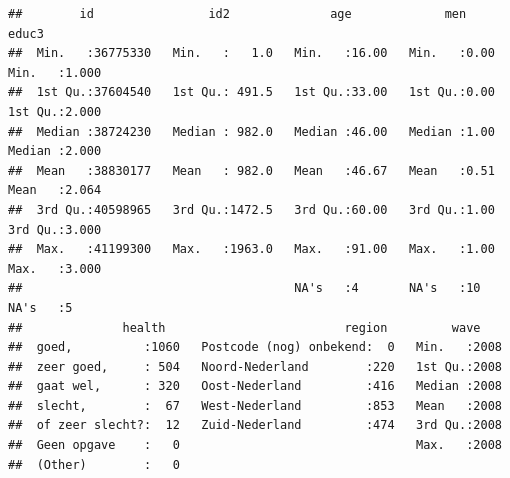 \documentclass[
]{book}
\newenvironment{Shaded}{\begin{snugshade}}{\end{snugshade}}
\newcommand{\CommentTok}[1]{\textcolor[rgb]{0.56,0.35,0.01}{\textit{#1}}}
\newcommand{\DecValTok}[1]{\textcolor[rgb]{0.00,0.00,0.81}{#1}}
\newcommand{\KeywordTok}[1]{\textcolor[rgb]{0.13,0.29,0.53}{\textbf{#1}}}
\newcommand{\NormalTok}[1]{#1}
\newcommand{\OperatorTok}[1]{\textcolor[rgb]{0.81,0.36,0.00}{\textbf{#1}}}
\newcommand{\StringTok}[1]{\textcolor[rgb]{0.31,0.60,0.02}{#1}}
\begin{document}
\begin{Shaded}
\end{Shaded}

\begin{verbatim}
##        id                id2              age             men           educ3      
##  Min.   :36775330   Min.   :   1.0   Min.   :16.00   Min.   :0.00   Min.   :1.000  
##  1st Qu.:37604540   1st Qu.: 491.5   1st Qu.:33.00   1st Qu.:0.00   1st Qu.:2.000  
##  Median :38724230   Median : 982.0   Median :46.00   Median :1.00   Median :2.000  
##  Mean   :38830177   Mean   : 982.0   Mean   :46.67   Mean   :0.51   Mean   :2.064  
##  3rd Qu.:40598965   3rd Qu.:1472.5   3rd Qu.:60.00   3rd Qu.:1.00   3rd Qu.:3.000  
##  Max.   :41199300   Max.   :1963.0   Max.   :91.00   Max.   :1.00   Max.   :3.000  
##                                      NA's   :4       NA's   :10     NA's   :5      
##              health                         region         wave     
##  goed,          :1060   Postcode (nog) onbekend:  0   Min.   :2008  
##  zeer goed,     : 504   Noord-Nederland        :220   1st Qu.:2008  
##  gaat wel,      : 320   Oost-Nederland         :416   Median :2008  
##  slecht,        :  67   West-Nederland         :853   Mean   :2008  
##  of zeer slecht?:  12   Zuid-Nederland         :474   3rd Qu.:2008  
##  Geen opgave    :   0                                 Max.   :2008  
##  (Other)        :   0
\end{verbatim}
\end{document}
